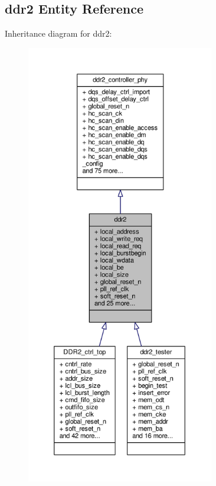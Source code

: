 \subsection{ddr2 Entity Reference}
\label{classddr2}


Inheritance diagram for ddr2\+:\nopagebreak
\begin{figure}[H]
\begin{center}
\leavevmode
\includegraphics[height=550pt]{df/d0c/classddr2__inherit__graph}
\end{center}
\end{figure}


